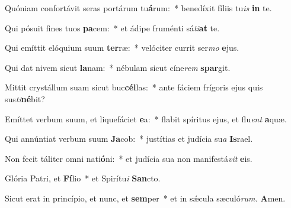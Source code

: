 \item Quóniam confortávit seras portárum tu\textbf{á}rum:~* benedíxit fíliis tu\tinyhspace\textit{is} \textbf{in} te.
\item Qui pósuit fines tuos \textbf{pa}cem:~* et ádipe fruménti sá\tinyhspace\textit{ti}\textbf{at} te.
\item Qui emíttit elóquium suum \textbf{ter}ræ:~* velóciter currit ser\textit{mo} \textbf{e}jus.
\item Qui dat nivem sicut \textbf{la}nam:~* nébulam sicut cíne\tinyhspace\textit{rem} \textbf{spar}git.
\item Mittit crystállum suam sicut buc\textbf{cél}las:~* ante fáciem frígoris ejus quis sus\-\tinyhspace\textit{ti}\textbf{né}bit?
\item Emíttet verbum suum, et liquefáciet \textbf{e}a:~* flabit spíritus ejus, et flu\tinyhspace\textit{ent} \textbf{a}quæ.
\item Qui annúntiat verbum suum \textbf{Ja}cob:~* justítias et judícia su\tinyhspace\textit{a} \textbf{Is}rael.
\item Non fecit táliter omni nati\textbf{ó}ni:~* et judícia sua non manife\-stá\tinyhspace\textit{vit} \textbf{e}is.
\item Glória Patri, et \textbf{Fí}lio~* et Spirítu\tinyhspace\textit{i} \textbf{San}cto.
\item Sicut erat in princípio, et nunc, et \textbf{sem}per~* et in sǽcula sæculó\textit{rum.} \textbf{A}men.
